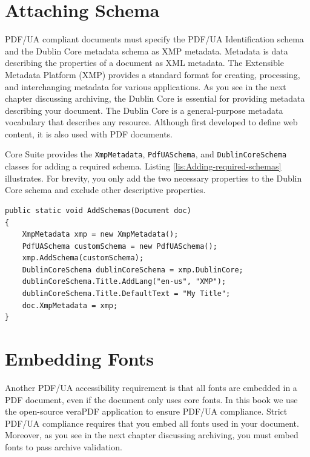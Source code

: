 \documentclass[american,letterpaper]{tufte-book}
\numberwithin{equation}{section}
\numberwithin{figure}{section}
\begin{document}
{{\section{Attaching Schema}

PDF/UA compliant documents must specify the PDF/UA Identification
schema and the Dublin Core metadata schema as XMP metadata. Metadata is data describing the properties of a document as XML metadata.
The Extensible Metadata Platform (XMP) provides a standard format
for creating, processing, and interchanging metadata for various applications.
As you see in the next chapter discussing archiving, the Dublin Core
is essential for providing metadata describing your document. The
Dublin Core is a general-purpose metadata vocabulary that describes
any resource. Although first developed to define web content,
it is also used with PDF documents.

Core Suite provides the \texttt{XmpMetadata}, \texttt{PdfUASchema},
and \texttt{DublinCoreSchema} classes for adding a required schema. Listing \ref{lis:Adding-required-schemas} illustrates.
For brevity, you only add the two necessary properties to the Dublin
Core schema and exclude other descriptive properties.

\bgroup{}
\begin{lstlisting}[caption={Adding required schema to a PDF.},label={lis:Adding-required-schemas},basicstyle={\small\ttfamily},breaklines=true]
public static void AddSchemas(Document doc)
{
    XmpMetadata xmp = new XmpMetadata();
    PdfUASchema customSchema = new PdfUASchema();
    xmp.AddSchema(customSchema);
    DublinCoreSchema dublinCoreSchema = xmp.DublinCore;
    dublinCoreSchema.Title.AddLang("en-us", "XMP");
    dublinCoreSchema.Title.DefaultText = "My Title";
    doc.XmpMetadata = xmp; 
}
\end{lstlisting}
\leavevmode\egroup


\section{Embedding Fonts}\label{sec:Embedding-Fonts}

Another PDF/UA accessibility requirement is that all fonts are embedded
in a PDF document, even if the document only uses core fonts. In this book we use the open-source veraPDF application to ensure
PDF/UA compliance. Strict PDF/UA compliance requires that you embed
all fonts used in your document. Moreover, as you see in the next
chapter discussing archiving, you must embed fonts to pass archive
validation.

}}
\end{document}
